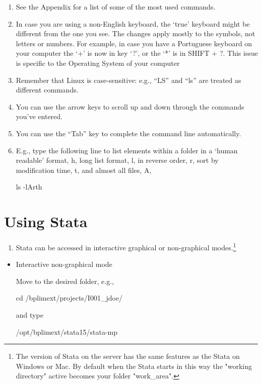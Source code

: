 \documentclass[]{book}
\providecommand{\tightlist}{%
  \setlength{\itemsep}{0pt}\setlength{\parskip}{0pt}}
\let\rmarkdownfootnote\footnote%
\def\footnote{\protect\rmarkdownfootnote}
\begin{document}
\begin{enumerate}
\def\labelenumi{\arabic{enumi}.}
\setcounter{enumi}{1}
\item
  See the Appendix for a list of some of the most used commands.
\item
  In case you are using a non-English keyboard, the `true' keyboard
  might be different from the one you see. The changes apply mostly
  to the symbols, not letters or numbers. For example, in case you
  have a Portuguese keyboard on your computer the `+' is now in key
  `?', or the `*' is in SHIFT + ?. This issue is specific to the
  Operating System of your computer
\item
  Remember that Linux is case-sensitive: e.g., ``LS'' and ``ls'' are
  treated as different commands.
\item
  You can use the arrow keys to scroll up and down through the
  commands you've entered.
\item
  You can use the ``Tab'' key to complete the command line
  automatically.
\item
  E.g., type the following line to list elements within a folder in a
  `human readable' format, h, long list format, l, in reverse order,
  r, sort by modification time, t, and almost all files, A,

  ls -lArth
\end{enumerate}

\hypertarget{using-stata}{%
\section{\texorpdfstring{{Using Stata}}{Using Stata}}\label{using-stata}}

\begin{enumerate}
\def\labelenumi{\arabic{enumi}.}
\tightlist
\item
  Stata can be accessed in interactive graphical or non-graphical
  modes.\footnote{The version of Stata on the server has the same features as the
    Stata on Windows or Mac. By default when the Stata starts in this
    way the "working directory" active becomes your folder
    "work\_area".}
\end{enumerate}

\begin{itemize}
\item
  Interactive non-graphical mode

  Move to the desired folder, e.g.,

  cd /bplimext/projects/I001\_jdoe/

  and type

  /opt/bplimext/stata15/stata-mp
\end{itemize}
\end{document}
